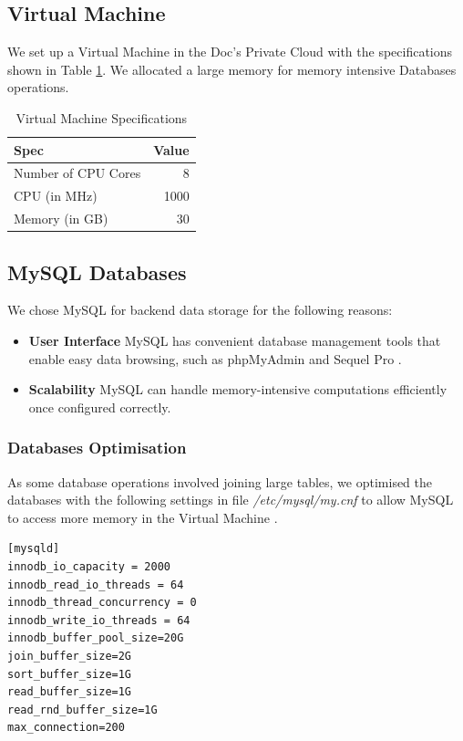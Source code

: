 \subsection{Virtual Machine}
\par We set up a Virtual Machine in the Doc's Private Cloud\cite{private_cloud} with the specifications shown in Table \ref{table:virtual_machine}. We allocated a large memory for memory intensive Databases operations.

\begin{table}
\centering
\begin{tabular}{@{}lr@{}} \toprule
Spec & Value \\ \midrule
Number of CPU Cores & 8 \\
CPU (in MHz) & 1000 \\
Memory (in GB) & 30 \\
 \bottomrule
\end{tabular}
\caption{Virtual Machine Specifications}
\label{table:virtual_machine}
\end{table}

\subsection{MySQL Databases}
\par We chose MySQL for backend data storage for the following reasons:

\begin{itemize}
  \item \textbf{User Interface} MySQL has convenient database management tools that enable easy data browsing, such as phpMyAdmin\cite{phpmyadmin} and Sequel Pro \cite{sequel_pro}.
  \item \textbf{Scalability} MySQL can handle memory-intensive computations efficiently once configured correctly.
\end{itemize}

\subsubsection{Databases Optimisation}
\par As some database operations involved joining large tables, we optimised the databases with the following settings in file \textit{/etc/mysql/my.cnf} to allow MySQL to access more memory in the Virtual Machine \cite{setting_innodb_buffer_pool_size,innodb_buffer}.

\begin{verbatim}
[mysqld]
innodb_io_capacity = 2000
innodb_read_io_threads = 64
innodb_thread_concurrency = 0
innodb_write_io_threads = 64
innodb_buffer_pool_size=20G
join_buffer_size=2G
sort_buffer_size=1G
read_buffer_size=1G
read_rnd_buffer_size=1G
max_connection=200
\end{verbatim}



